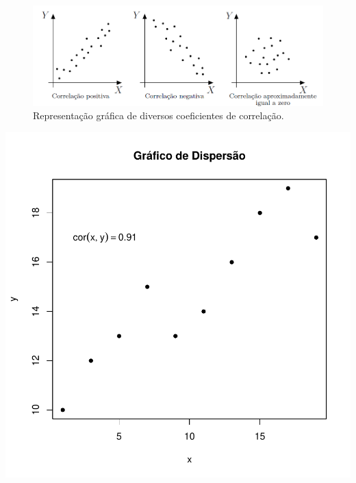 \documentclass[14pt,aspectratio=1610]{beamer}
\begin{document}
\begin{frame}{}
\frametitle{}
\begin{block}{}
\begin{figure}[H]
    \centering
    \includegraphics[scale=0.5]{figs/correlacao}
    \caption{Representação gráfica de diversos coeficientes de correlação.}
  \end{figure}
\end{block}
\end{frame}

\begin{frame}[fragile]{}
\begin{center}
\includegraphics{Aula10-003}
\end{center}
\end{frame}
\end{document}
